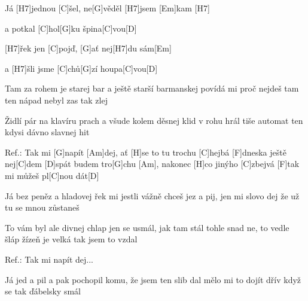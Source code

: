 
Já [H7]jednou [C]\null šel, ne[G]věděl [H7]jsem [Em]kam [H7]

a potkal [C]hol[G]ku špina[C]vou[D]

[H7]\null řek jen [C]pojď, [G]ať nej[H7]du sám[Em]

a [H7]\null šli jsme [C]chů[G]zí houpa[C]vou[D]

Tam za rohem je starej bar
a ještě starší barmanskej
povídá mi proč nejdeš tam
ten nápad nebyl zas tak zlej

Židlí pár na klavíru prach
a všude kolem děsnej klid
v rohu hrál tiše automat
ten kdysi dávno slavnej hit

Ref.: Tak mi [G]napít [Am]dej, ať [H]se to tu trochu [C]hejbá
[F]dneska ještě nej[C]dem [D]spát
budem tro[G]chu [Am], nakonec [H]co jinýho [C]zbejvá
[F]tak mi můžeš pl[C]nou dát[D]

Já bez peněz a hladovej
řek mi jestli vážně chceš
jez a pij, jen mi slovo dej
že už tu se mnou zůstaneš

To vám byl ale divnej chlap
jen se usmál, jak tam stál
tohle snad ne, to vedle šláp
žízeň je velká tak jsem to vzdal

Ref.: Tak mi napít dej...

Já jed a pil a pak pochopil
komu, že jsem ten slib dal
mělo mi to dojít dřív
když se tak ďábelsky smál 



